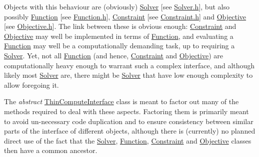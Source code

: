 Objects with this behaviour are (obviously) \mbox{\hyperlink{class_s_m_spp__di__unipi__it_1_1_solver}{Solver}} \mbox{[}see \mbox{\hyperlink{_solver_8h}{Solver.\+h}}\mbox{]}, but also possibly \mbox{\hyperlink{class_s_m_spp__di__unipi__it_1_1_function}{Function}} \mbox{[}see \mbox{\hyperlink{_function_8h}{Function.\+h}}\mbox{]}, \mbox{\hyperlink{class_s_m_spp__di__unipi__it_1_1_constraint}{Constraint}} \mbox{[}see \mbox{\hyperlink{_constraint_8h}{Constraint.\+h}}\mbox{]} and \mbox{\hyperlink{class_s_m_spp__di__unipi__it_1_1_objective}{Objective}} \mbox{[}see \mbox{\hyperlink{_objective_8h}{Objective.\+h}}\mbox{]}. The link between these is obvious enough\+: \mbox{\hyperlink{class_s_m_spp__di__unipi__it_1_1_constraint}{Constraint}} and \mbox{\hyperlink{class_s_m_spp__di__unipi__it_1_1_objective}{Objective}} may well be implemented in terms of \mbox{\hyperlink{class_s_m_spp__di__unipi__it_1_1_function}{Function}}, and evaluating a \mbox{\hyperlink{class_s_m_spp__di__unipi__it_1_1_function}{Function}} may well be a computationally demanding task, up to requiring a \mbox{\hyperlink{class_s_m_spp__di__unipi__it_1_1_solver}{Solver}}. Yet, not all \mbox{\hyperlink{class_s_m_spp__di__unipi__it_1_1_function}{Function}} (and hence, \mbox{\hyperlink{class_s_m_spp__di__unipi__it_1_1_constraint}{Constraint}} and \mbox{\hyperlink{class_s_m_spp__di__unipi__it_1_1_objective}{Objective}}) are computationally heavy enough to warrant such a complex interface, and although likely most \mbox{\hyperlink{class_s_m_spp__di__unipi__it_1_1_solver}{Solver}} are, there might be \mbox{\hyperlink{class_s_m_spp__di__unipi__it_1_1_solver}{Solver}} that have low enough complexity to allow foregoing it.

The {\itshape abstract} \mbox{\hyperlink{class_s_m_spp__di__unipi__it_1_1_thin_compute_interface}{Thin\+Compute\+Interface}} class is meant to factor out many of the methods required to deal with these aspects. Factoring them is primarily meant to avoid un-\/necessary code duplication and to ensure consistency between similar parts of the interface of different objects, although there is (currently) no planned direct use of the fact that the \mbox{\hyperlink{class_s_m_spp__di__unipi__it_1_1_solver}{Solver}}, \mbox{\hyperlink{class_s_m_spp__di__unipi__it_1_1_function}{Function}}, \mbox{\hyperlink{class_s_m_spp__di__unipi__it_1_1_constraint}{Constraint}} and \mbox{\hyperlink{class_s_m_spp__di__unipi__it_1_1_objective}{Objective}} classes then have a common ancestor.

